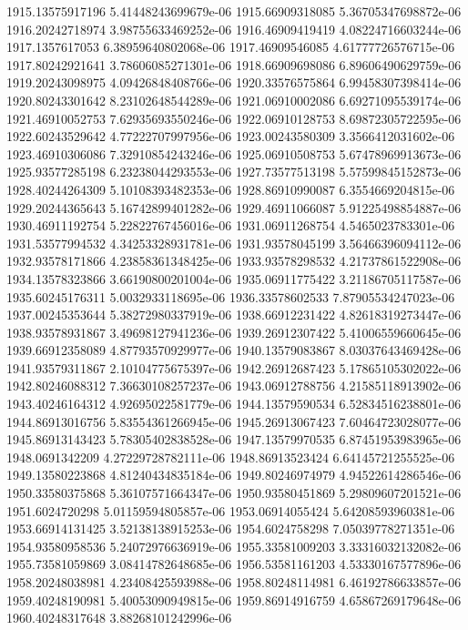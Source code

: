 {1915.13575917196 5.41448243699679e-06
1915.66909318085 5.36705347698872e-06
1916.20242718974 3.98755633469252e-06
1916.46909419419 4.08224716603244e-06
1917.1357617053 6.38959640802068e-06
1917.46909546085 4.61777726576715e-06
1917.80242921641 3.78606085271301e-06
1918.66909698086 6.89606490629759e-06
1919.20243098975 4.09426848408766e-06
1920.33576575864 6.99458307398414e-06
1920.80243301642 8.23102648544289e-06
1921.06910002086 6.69271095539174e-06
1921.46910052753 7.62935693550246e-06
1922.06910128753 8.69872305722595e-06
1922.60243529642 4.77222707997956e-06
1923.00243580309 3.3566412031602e-06
1923.46910306086 7.32910854243246e-06
1925.06910508753 5.67478969913673e-06
1925.93577285198 6.23238044293553e-06
1927.73577513198 5.57599845152873e-06
1928.40244264309 5.10108393482353e-06
1928.86910990087 6.3554669204815e-06
1929.20244365643 5.16742899401282e-06
1929.46911066087 5.91225498854887e-06
1930.46911192754 5.22822767456016e-06
1931.06911268754 4.5465023783301e-06
1931.53577994532 4.34253328931781e-06
1931.93578045199 3.56466396094112e-06
1932.93578171866 4.23858361348425e-06
1933.93578298532 4.21737861522908e-06
1934.13578323866 3.66190800201004e-06
1935.06911775422 3.21186705117587e-06
1935.60245176311 5.0032933118695e-06
1936.33578602533 7.87905534247023e-06
1937.00245353644 5.38272980337919e-06
1938.66912231422 4.82618319273447e-06
1938.93578931867 3.49698127941236e-06
1939.26912307422 5.41006559660645e-06
1939.66912358089 4.87793570929977e-06
1940.13579083867 8.03037643469428e-06
1941.93579311867 2.10104775675397e-06
1942.26912687423 5.17865105302022e-06
1942.80246088312 7.36630108257237e-06
1943.06912788756 4.21585118913902e-06
1943.40246164312 4.92695022581779e-06
1944.13579590534 6.52834516238801e-06
1944.86913016756 5.83554361266945e-06
1945.26913067423 7.60464723028077e-06
1945.86913143423 5.78305402838528e-06
1947.13579970535 6.87451953983965e-06
1948.0691342209 4.27229728782111e-06
1948.86913523424 6.64145721255525e-06
1949.13580223868 4.81240434835184e-06
1949.80246974979 4.94522614286546e-06
1950.33580375868 5.36107571664347e-06
1950.93580451869 5.29809607201521e-06
1951.6024720298 5.01159594805857e-06
1953.06914055424 5.64208593960381e-06
1953.66914131425 3.52138138915253e-06
1954.6024758298 7.05039778271351e-06
1954.93580958536 5.24072976636919e-06
1955.33581009203 3.33316032132082e-06
1955.73581059869 3.08414782648685e-06
1956.53581161203 4.53330167577896e-06
1958.20248038981 4.23408425593988e-06
1958.80248114981 6.46192786633857e-06
1959.40248190981 5.40053090949815e-06
1959.86914916759 4.65867269179648e-06
1960.40248317648 3.88268101242996e-06
}

